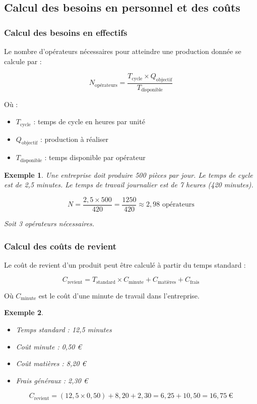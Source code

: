 \documentclass[a4paper,12pt]{article}
\newtheorem{exemple}{Exemple}[section]
\begin{document}
\subsection{Calcul des besoins en personnel et des coûts}

\subsubsection{Calcul des besoins en effectifs}

Le nombre d'opérateurs nécessaires pour atteindre une production donnée se calcule par :

\[
N_{\text{opérateurs}} = \frac{T_{\text{cycle}} \times Q_{\text{objectif}}}{T_{\text{disponible}}}
\]

Où :
\begin{itemize}
    \item $T_{\text{cycle}}$ : temps de cycle en heures par unité
    \item $Q_{\text{objectif}}$ : production à réaliser
    \item $T_{\text{disponible}}$ : temps disponible par opérateur
\end{itemize}

\begin{exemple}
Une entreprise doit produire 500 pièces par jour. Le temps de cycle est de 2,5 minutes. Le temps de travail journalier est de 7 heures (420 minutes).

\[
N = \frac{2,5 \times 500}{420} = \frac{1250}{420} \approx 2,98 \text{ opérateurs}
\]

Soit 3 opérateurs nécessaires.
\end{exemple}

\subsubsection{Calcul des coûts de revient}

Le coût de revient d'un produit peut être calculé à partir du temps standard :

\[
C_{\text{revient}} = T_{\text{standard}} \times C_{\text{minute}} + C_{\text{matières}} + C_{\text{frais}}
\]

Où $C_{\text{minute}}$ est le coût d'une minute de travail dans l'entreprise.

\begin{exemple}
\begin{itemize}
    \item Temps standard : 12,5 minutes
    \item Coût minute : 0,50 €
    \item Coût matières : 8,20 €
    \item Frais généraux : 2,30 €
\end{itemize}

\[
C_{\text{revient}} = (12,5 \times 0,50) + 8,20 + 2,30 = 6,25 + 10,50 = 16,75\ €
\]
\end{exemple}
\end{document}
